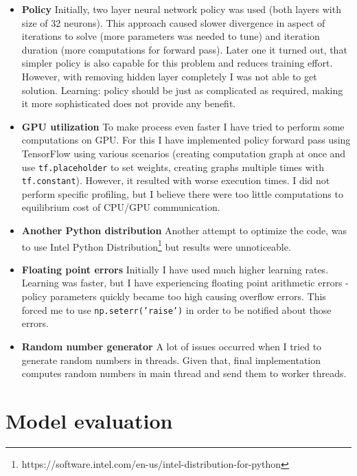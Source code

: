 \documentclass[12pt]{article}
\begin{document}
\begin{itemize}
\item{\textbf{Policy}} Initially, two layer neural network policy was used (both layers with size of 32 neurons). This approach caused slower divergence in aspect of iterations to solve (more parameters was needed to tune) and iteration duration (more computations for forward pass). Later one it turned out, that simpler policy is also capable for this problem and reduces training effort. However, with removing hidden layer completely I was not able to get solution. Learning: policy should be just as complicated as required, making it more sophisticated does not provide any benefit.

\item{\textbf{GPU utilization}} To make process even faster I have tried to perform some computations on GPU. For this I have implemented policy forward pass using TensorFlow\cite{tensorflow} using various scenarios (creating computation graph at once and use \texttt{tf.placeholder} to set weights, creating graphs multiple times with \texttt{tf.constant}). However, it resulted with worse execution times. I did not perform specific profiling, but I believe there were too little computations to equilibrium cost of CPU/GPU communication.

\item{\textbf{Another Python distribution}} Another attempt to optimize the code, was to use Intel Python Distribution\footnote{https://software.intel.com/en-us/intel-distribution-for-python} but results were unnoticeable.

\item{\textbf{Floating point errors}} Initially I have used much higher learning rates. Learning was faster, but I have experiencing floating point arithmetic errors - policy parameters quickly became too high causing overflow errors. This forced me to use \texttt{np.seterr('raise')} in order to be notified about those errors.

\item{\textbf{Random number generator}} A lot of issues occurred when I tried to generate random numbers in threads. Given that, final implementation computes random numbers in main thread and send them to worker threads.

\end{itemize}



\section{Model evaluation}
\end{document}
